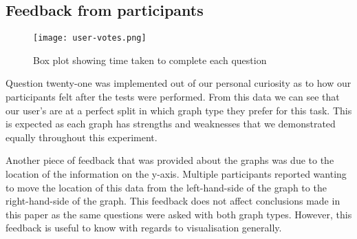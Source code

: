 \subsection*{Feedback from participants}
\begin{figure}[H]
    \centering
    \texttt{[image: user-votes.png]}
    \caption{Box plot showing time taken to complete each question}
\end{figure}
\begin{flushleft}
    \quad Question twenty-one was implemented out of our personal curiosity as to how our participants felt after the tests were performed.
    From this data we can see that our user's are at a perfect split in which graph type they prefer for this task. This is expected as 
    each graph has strengths and weaknesses that we demonstrated equally throughout this experiment.
    
    Another piece of feedback that was provided about the graphs was due to the location of the information on the y-axis. Multiple participants
    reported wanting to move the location of this data from the left-hand-side of the graph to the right-hand-side of the graph. This feedback does not affect
    conclusions made in this paper as the same questions were asked with both graph types. However, this feedback is useful to know with regards to visualisation
    generally.
\end{flushleft}


